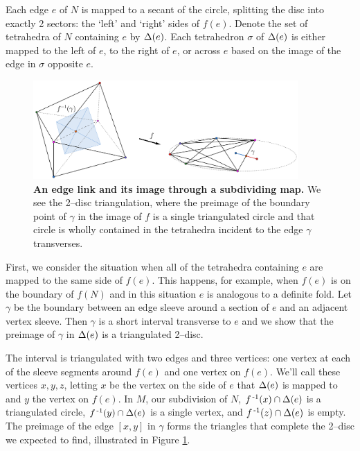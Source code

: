 Each edge $e$ of $N$ is mapped to a secant of the circle, splitting the disc into exactly 2 sectors: the `left' and `right' sides of $f(e)$.
Denote the set of tetrahedra of $N$ containing $e$ by $\Delta(e)$.
Each tetrahedron $\sigma$ of  $\Delta(e)$ is either mapped to the left of $e$, to the right of $e$, or across $e$ based on the image of the edge in $\sigma$ opposite $e$.

\begin{figure}[h!]
	\centering
	\includegraphics[width=0.9\textwidth]{figures/pl-definite-fold.png}
	\caption{
		\textbf{An edge link and its image through a subdividing map.}
		We see the 2--disc triangulation, where the preimage of the boundary point of $\gamma$ in the image of $f$ is a single triangulated circle and that circle is wholly contained in the tetrahedra incident to the edge $\gamma$ transverses.
	}
	\label{fig:pl-definite-fold}
\end{figure}

First, we consider the situation when all of the tetrahedra containing $e$ are mapped to the same side of $f(e)$.
This happens, for example, when $f(e)$ is on the boundary of $f(N)$ and in this situation $e$ is analogous to a definite fold.
Let $\gamma$ be the boundary between an edge sleeve around a section of $e$ and an adjacent vertex sleeve.
Then $\gamma$ is a short interval transverse to $e$ and we show that the preimage of $\gamma$ in $\Delta(e)$ is a triangulated 2--disc.

The interval is triangulated with two edges and three vertices: one vertex at each of the sleeve segments around $f(e)$ and one vertex on $f(e)$.
We'll call these vertices $x,y,z$, letting $x$ be the vertex on the side of $e$ that $\Delta(e)$ is mapped to and $y$ the vertex on $f(e)$.
In $M$, our subdivision of $N$, $f^{\,\text{-}1}(x)\cap\Delta(e)$ is a triangulated circle, $f^{\,\text{-}1}(y)\cap\Delta(e)$ is a single vertex, and $f^{\,\text{-}1}(z)\cap\Delta(e)$ is empty.
The preimage of the edge $[x,y]$ in $\gamma$ forms the triangles that complete the 2--disc we expected to find, illustrated in Figure \ref{fig:pl-definite-fold}.

